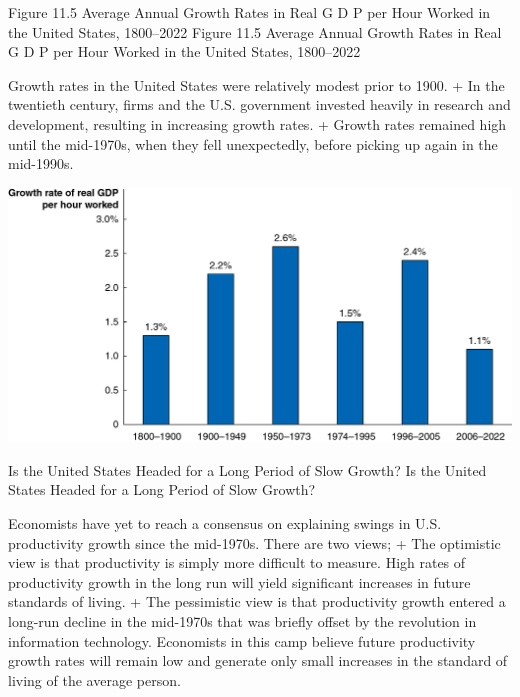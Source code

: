\documentclass[
  12pt,
  ignorenonframetext,
]{beamer}
\begin{document}
\begin{frame}{Figure 11.5 Average Annual Growth Rates in Real G D P per
Hour Worked in the United States, 1800--2022}
\protect\hypertarget{figure-11.5-average-annual-growth-rates-in-real-g-d-p-per-hour-worked-in-the-united-states-18002022}{}
Figure 11.5 Average Annual Growth Rates in Real G D P per Hour Worked in
the United States, 1800--2022

Growth rates in the United States were relatively modest prior to 1900.
+ In the twentieth century, firms and the U.S. government invested
heavily in research and development, resulting in increasing growth
rates. + Growth rates remained high until the mid-1970s, when they fell
unexpectedly, before picking up again in the mid-1990s.

\includegraphics[width=\textwidth,height=0.99\textheight]{imgs3/img_slide31a.png}
\end{frame}

\begin{frame}{Is the United States Headed for a Long Period of Slow
Growth?}
\protect\hypertarget{is-the-united-states-headed-for-a-long-period-of-slow-growth}{}
Is the United States Headed for a Long Period of Slow Growth?

Economists have yet to reach a consensus on explaining swings in U.S.
productivity growth since the mid-1970s. There are two views; + The
optimistic view is that productivity is simply more difficult to
measure. High rates of productivity growth in the long run will yield
significant increases in future standards of living. + The pessimistic
view is that productivity growth entered a long-run decline in the
mid-1970s that was briefly offset by the revolution in information
technology. Economists in this camp believe future productivity growth
rates will remain low and generate only small increases in the standard
of living of the average person.
\end{frame}
\end{document}
